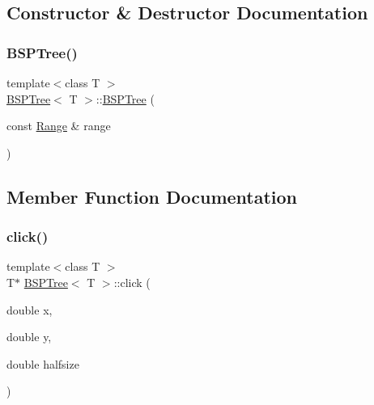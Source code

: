 \subsection{Constructor \& Destructor Documentation}
\mbox{\label{classBSPTree_ac0d5688da625398b735b724afa22891c_ac0d5688da625398b735b724afa22891c}} 
\subsubsection{\texorpdfstring{B\+S\+P\+Tree()}{BSPTree()}}
{\footnotesize\ttfamily template$<$class T $>$ \\
\hyperlink{classBSPTree}{B\+S\+P\+Tree}$<$ T $>$\+::\hyperlink{classBSPTree}{B\+S\+P\+Tree} (\begin{DoxyParamCaption}\item[{const \hyperlink{classRange}{Range} \&}]{range }\end{DoxyParamCaption})\hspace{0.3cm}{\ttfamily [inline]}}



\subsection{Member Function Documentation}
\mbox{\label{classBSPTree_a3f713d6aeb66e8b1c1f35f06d49edcf1_a3f713d6aeb66e8b1c1f35f06d49edcf1}} 
\subsubsection{\texorpdfstring{click()}{click()}\hspace{0.1cm}{\footnotesize\ttfamily [1/3]}}
{\footnotesize\ttfamily template$<$class T $>$ \\
T$\ast$ \hyperlink{classBSPTree}{B\+S\+P\+Tree}$<$ T $>$\+::click (\begin{DoxyParamCaption}\item[{double}]{x,  }\item[{double}]{y,  }\item[{double}]{halfsize }\end{DoxyParamCaption})\hspace{0.3cm}{\ttfamily [inline]}}

